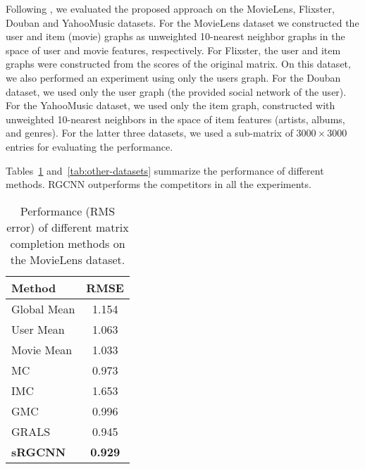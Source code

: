 \documentclass{article}
\begin{document}
Following \cite{rao2015collaborative}, we evaluated the proposed approach on the MovieLens, Flixster, Douban and YahooMusic datasets.  
For the MovieLens dataset we constructed the user and item (movie) graphs as unweighted 10-nearest neighbor graphs in the space of user and movie features, respectively. 
For Flixster, the user and item graphs were constructed from the scores of the original matrix. On this dataset, we also performed an experiment using only the users graph. 
For the Douban dataset, we used only the user graph (the provided social network of the user). 
For the YahooMusic dataset, we used only the item graph, constructed with unweighted 10-nearest neighbors in the space of item features (artists, albums, and genres). 
For the latter three datasets, we used a sub-matrix of $3000 \times 3000$ entries for evaluating the performance. 

Tables~\ref{tab:results-movielens} and~\ref{tab:other-datasets} summarize the performance of different methods. RGCNN outperforms the competitors in all the experiments. 



\begin{table}[!h]
\caption{Performance (RMS error) of different matrix completion methods on the MovieLens dataset.\vspace{-2.25mm}}
\label{tab:results-movielens}
\vskip 0.15in
\begin{center}
\begin{small}
\begin{sc}
\begin{tabular}{lc}
\hline
\abovespace\belowspace
Method & RMSE \\
\hline
\abovespace 
Global Mean & 1.154\\
User Mean & 1.063\\
Movie Mean & 1.033\\
MC \cite{candes2012exact} & 0.973\\
IMC \cite{jain2013provable,xu2013speedup} & 1.653\\
GMC  \cite{kalofolias2014matrix} & 0.996\\
GRALS \cite{rao2015collaborative} & 0.945\\
{\bf sRGCNN} & {\bf 0.929} \\
\hline
\end{tabular}
\end{sc}
\end{small}
\end{center}
\vskip -0.1in
\end{table}
\end{document}
